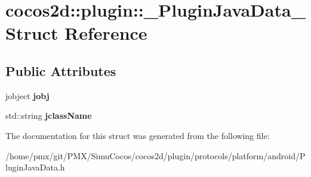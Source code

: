 \hypertarget{structcocos2d_1_1plugin_1_1__PluginJavaData__}{}\section{cocos2d\+:\+:plugin\+:\+:\+\_\+\+Plugin\+Java\+Data\+\_\+ Struct Reference}
\label{structcocos2d_1_1plugin_1_1__PluginJavaData__}
\subsection*{Public Attributes}
\begin{DoxyCompactItemize}
\item 
\mbox{\label{structcocos2d_1_1plugin_1_1__PluginJavaData___acf880b0a12ae5662aa30c9944fb484a9}} 
jobject {\bfseries jobj}
\item 
\mbox{\label{structcocos2d_1_1plugin_1_1__PluginJavaData___a3900ea386093eb59c1d8658543c3bdaa}} 
std\+::string {\bfseries jclass\+Name}
\end{DoxyCompactItemize}


The documentation for this struct was generated from the following file\+:\begin{DoxyCompactItemize}
\item 
/home/pmx/git/\+P\+M\+X/\+Simu\+Cocos/cocos2d/plugin/protocols/platform/android/Plugin\+Java\+Data.\+h\end{DoxyCompactItemize}

